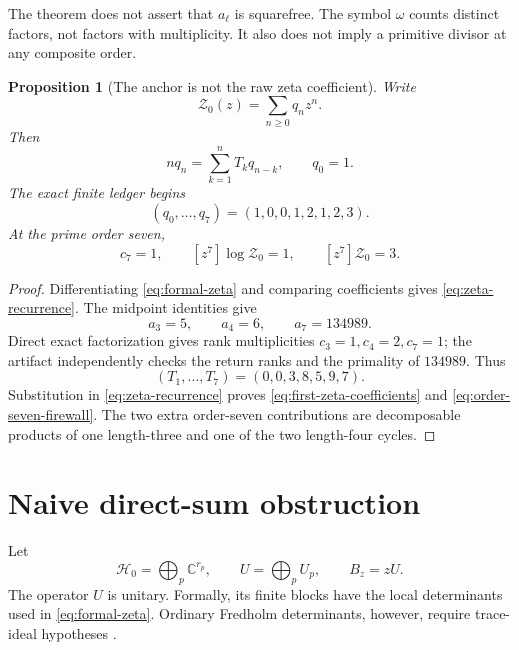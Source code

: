 \documentclass[11pt]{article}
\numberwithin{equation}{section}
\newtheorem{proposition}[theorem]{Proposition}
\theoremstyle{remark}
\newcommand{\C}{\mathbb C}
\newcommand{\cZ}{\mathcal Z}
\newcommand{\cH}{\mathcal H}
\begin{document}
The theorem does not assert that \(a_\ell\) is squarefree.  The symbol
\(\omega\) counts distinct factors, not factors with multiplicity.  It also
does not imply a primitive divisor at any composite order.

\begin{proposition}[The anchor is not the raw zeta coefficient]
\label{prop:raw-firewall}
Write
\begin{equation}
 \cZ_0(z)=\sum_{n\ge0}q_nz^n.
 \label{eq:raw-coefficients}
\end{equation}
Then
\begin{equation}
 nq_n=\sum_{k=1}^nT_kq_{n-k},
 \qquad q_0=1.
 \label{eq:zeta-recurrence}
\end{equation}
The exact finite ledger begins
\begin{equation}
 (q_0,\ldots,q_7)=(1,0,0,1,2,1,2,3).
 \label{eq:first-zeta-coefficients}
\end{equation}
At the prime order seven,
\begin{equation}
 c_7=1,
 \qquad
 [z^7]\log\cZ_0=1,
 \qquad
 [z^7]\cZ_0=3.
 \label{eq:order-seven-firewall}
\end{equation}
\end{proposition}

\begin{proof}
Differentiating \eqref{eq:formal-zeta} and comparing coefficients gives
\eqref{eq:zeta-recurrence}.  The midpoint identities give
\[
 a_3=5,\qquad a_4=6,\qquad a_7=134989.
\]
Direct exact factorization gives rank multiplicities
\(
c_3=1,c_4=2,c_7=1
\);
the artifact independently checks the return ranks and the primality of
\(134989\).  Thus
\[
 (T_1,\ldots,T_7)=(0,0,3,8,5,9,7).
\]
Substitution in \eqref{eq:zeta-recurrence} proves
\eqref{eq:first-zeta-coefficients} and \eqref{eq:order-seven-firewall}.
The two extra order-seven contributions are decomposable products of one
length-three and one of the two length-four cycles.
\end{proof}

\section{Naive direct-sum obstruction}
\label{sec:naive-operator}

Let
\begin{equation}
 \cH_0=\bigoplus_p\C^{r_p},
 \qquad
 U=\bigoplus_pU_p,
 \qquad
 B_z=zU.
 \label{eq:naive-operator}
\end{equation}
The operator \(U\) is unitary.  Formally, its finite blocks have the local
determinants used in \eqref{eq:formal-zeta}.  Ordinary Fredholm determinants,
however, require trace-ideal hypotheses \citep{Simon2005}.
\end{document}
